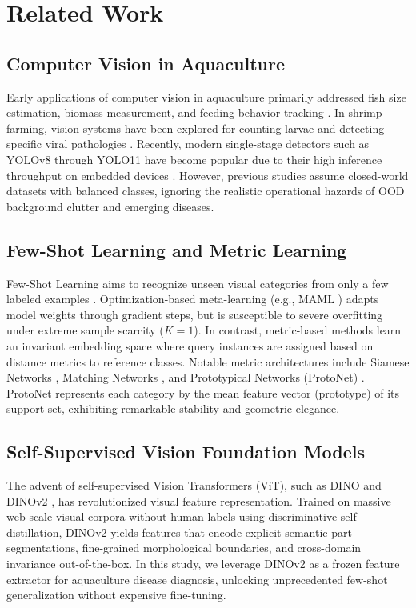 \documentclass[conference]{IEEEtran}
\begin{document}
\section{Related Work}

\subsection{Computer Vision in Aquaculture}
Early applications of computer vision in aquaculture primarily addressed fish size estimation, biomass measurement, and feeding behavior tracking \cite{mathiassen2011automated, zion2012use}. In shrimp farming, vision systems have been explored for counting larvae and detecting specific viral pathologies \cite{shete2020deep}. Recently, modern single-stage detectors such as YOLOv8 through YOLO11 have become popular due to their high inference throughput on embedded devices \cite{jocher2024yolo}. However, previous studies assume closed-world datasets with balanced classes, ignoring the realistic operational hazards of OOD background clutter and emerging diseases.

\subsection{Few-Shot Learning and Metric Learning}
Few-Shot Learning aims to recognize unseen visual categories from only a few labeled examples \cite{wang2020generalizing}. Optimization-based meta-learning (e.g., MAML \cite{finn2017model-agnostic}) adapts model weights through gradient steps, but is susceptible to severe overfitting under extreme sample scarcity ($K=1$). In contrast, metric-based methods learn an invariant embedding space where query instances are assigned based on distance metrics to reference classes. Notable metric architectures include Siamese Networks \cite{koch2015siamese}, Matching Networks \cite{vinyals2016matching}, and Prototypical Networks (ProtoNet) \cite{snell2017prototypical}. ProtoNet represents each category by the mean feature vector (prototype) of its support set, exhibiting remarkable stability and geometric elegance.

\subsection{Self-Supervised Vision Foundation Models}
The advent of self-supervised Vision Transformers (ViT), such as DINO and DINOv2 \cite{caron2021emerging, oquab2023dinov2}, has revolutionized visual feature representation. Trained on massive web-scale visual corpora without human labels using discriminative self-distillation, DINOv2 yields features that encode explicit semantic part segmentations, fine-grained morphological boundaries, and cross-domain invariance out-of-the-box. In this study, we leverage DINOv2 as a frozen feature extractor for aquaculture disease diagnosis, unlocking unprecedented few-shot generalization without expensive fine-tuning.
\end{document}
